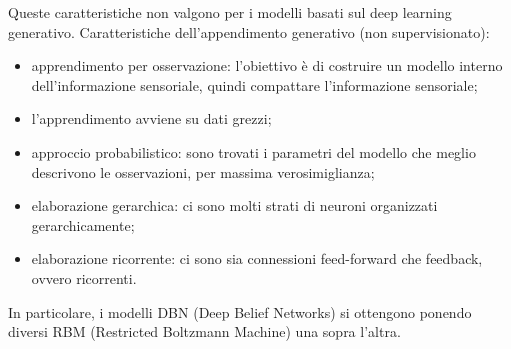 Queste caratteristiche non valgono per i modelli basati sul deep learning
generativo. Caratteristiche dell'appendimento generativo (non supervisionato):
\begin{itemize}
	\item apprendimento per osservazione: l'obiettivo è di costruire un modello
		interno dell'informazione sensoriale, quindi compattare l'informazione
		sensoriale;

	\item l'apprendimento avviene su dati grezzi;

	\item approccio probabilistico: sono trovati i parametri del modello che
		meglio descrivono le osservazioni, per massima verosimiglianza;

	\item elaborazione gerarchica: ci sono molti strati di neuroni organizzati
		gerarchicamente;

	\item elaborazione ricorrente: ci sono sia connessioni feed-forward che
		feedback, ovvero ricorrenti.
\end{itemize}

In particolare, i modelli DBN (Deep Belief Networks) si ottengono
ponendo diversi RBM (Restricted Boltzmann Machine) una sopra l'altra.
